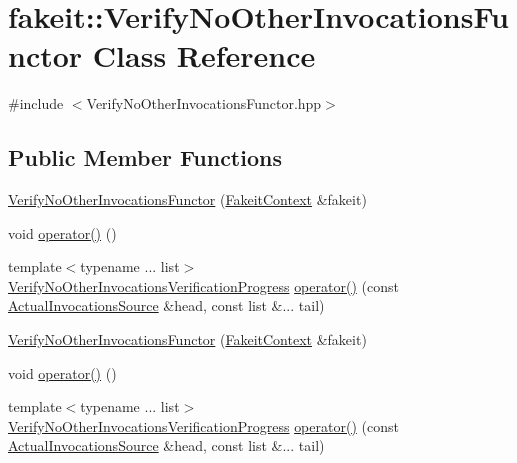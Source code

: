 \hypertarget{classfakeit_1_1VerifyNoOtherInvocationsFunctor}{}\section{fakeit\+::Verify\+No\+Other\+Invocations\+Functor Class Reference}
\label{classfakeit_1_1VerifyNoOtherInvocationsFunctor}


{\ttfamily \#include $<$Verify\+No\+Other\+Invocations\+Functor.\+hpp$>$}

\subsection*{Public Member Functions}
\begin{DoxyCompactItemize}
\item 
\mbox{\hyperlink{classfakeit_1_1VerifyNoOtherInvocationsFunctor_ac17e4b84ac34bbdfe2f47a6d9e64e310}{Verify\+No\+Other\+Invocations\+Functor}} (\mbox{\hyperlink{structfakeit_1_1FakeitContext}{Fakeit\+Context}} \&fakeit)
\item 
void \mbox{\hyperlink{classfakeit_1_1VerifyNoOtherInvocationsFunctor_a40fae42fc436deb576fd08482382811a}{operator()}} ()
\item 
{\footnotesize template$<$typename ... list$>$ }\\\mbox{\hyperlink{classfakeit_1_1VerifyNoOtherInvocationsVerificationProgress}{Verify\+No\+Other\+Invocations\+Verification\+Progress}} \mbox{\hyperlink{classfakeit_1_1VerifyNoOtherInvocationsFunctor_a6f43e7d3b976534fa8f22abfad04004a}{operator()}} (const \mbox{\hyperlink{structfakeit_1_1ActualInvocationsSource}{Actual\+Invocations\+Source}} \&head, const list \&... tail)
\item 
\mbox{\hyperlink{classfakeit_1_1VerifyNoOtherInvocationsFunctor_ac17e4b84ac34bbdfe2f47a6d9e64e310}{Verify\+No\+Other\+Invocations\+Functor}} (\mbox{\hyperlink{structfakeit_1_1FakeitContext}{Fakeit\+Context}} \&fakeit)
\item 
void \mbox{\hyperlink{classfakeit_1_1VerifyNoOtherInvocationsFunctor_a40fae42fc436deb576fd08482382811a}{operator()}} ()
\item 
{\footnotesize template$<$typename ... list$>$ }\\\mbox{\hyperlink{classfakeit_1_1VerifyNoOtherInvocationsVerificationProgress}{Verify\+No\+Other\+Invocations\+Verification\+Progress}} \mbox{\hyperlink{classfakeit_1_1VerifyNoOtherInvocationsFunctor_a6f43e7d3b976534fa8f22abfad04004a}{operator()}} (const \mbox{\hyperlink{structfakeit_1_1ActualInvocationsSource}{Actual\+Invocations\+Source}} \&head, const list \&... tail)

\end{DoxyCompactItemize}
